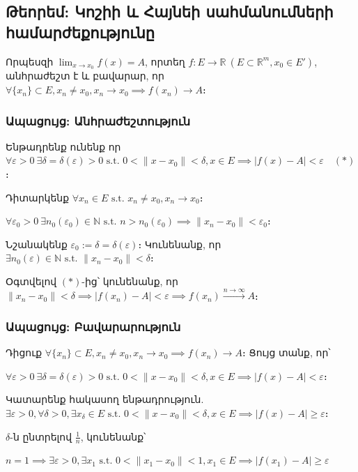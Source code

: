 \documentclass[12pt, a4paper]{article}
\begin{document}
\subsection{Թեորեմ: Կոշիի և Հայնեի սահմանումների համարժեքությունը}

Որպեսզի $\lim_{x \to x_0} f(x) = A$, որտեղ $f: E \to \mathbb{R} \ (E \subset \mathbb{R}^m, x_0 \in E')$, անհրաժեշտ է և բավարար, որ $\forall \{x_n\} \subset E, x_n \neq x_0, x_n \to x_0 \implies f(x_n) \to A$։

\subsubsection{Ապացույց: Անհրաժեշտություն}

Ենթադրենք ունենք որ $\forall \varepsilon > 0 \ \exists \delta = \delta(\varepsilon) > 0 \text{ s.t. } 0 < \|x - x_0\| < \delta, x \in E \implies |f(x) - A| < \varepsilon \quad (*)$։

Դիտարկենք $\forall x_n \in E \text{ s.t. } x_n \neq x_0, x_n \to x_0$։

$\forall \varepsilon_0 > 0 \ \exists n_0(\varepsilon_0) \in \mathbb{N} \text{ s.t. } n > n_0(\varepsilon_0) \implies \|x_n - x_0\| < \varepsilon_0$։

Նշանակենք $\varepsilon_0 := \delta = \delta(\varepsilon)$։ Կունենանք, որ $\exists n_0(\varepsilon) \in \mathbb{N} \text{ s.t. } \|x_n - x_0\| < \delta$։

Օգտվելով $(*)$-ից՝ կունենանք, որ $\|x_n - x_0\| < \delta \implies |f(x_n) - A| < \varepsilon \implies f(x_n) \overset{n \to \infty}{\longrightarrow} A$։

\subsubsection{Ապացույց: Բավարարություն}

Դիցուք $\forall \{x_n\} \subset E, x_n \neq x_0, x_n \to x_0 \implies f(x_n) \to A$։ Ցույց տանք, որ՝

$\forall \varepsilon > 0 \ \exists \delta = \delta(\varepsilon) > 0 \text{ s.t. } 0 < \|x - x_0\| < \delta, x \in E \implies |f(x) - A| < \varepsilon$։

Կատարենք հակասող ենթադրություն. $\exists \varepsilon > 0, \forall \delta > 0, \exists x_{\delta} \in E \text{ s.t. } 0 < \|x - x_0\| < \delta, x \in E \implies |f(x) - A| \ge \varepsilon$։

$\delta$-ն ընտրելով $\frac{1}{n}$, կունենանք՝

$n = 1 \implies \exists \varepsilon > 0, \exists x_1 \text{ s.t. } 0 < \|x_1 - x_0\| < 1, x_1 \in E \implies |f(x_1) - A| \ge \varepsilon$
\end{document}
